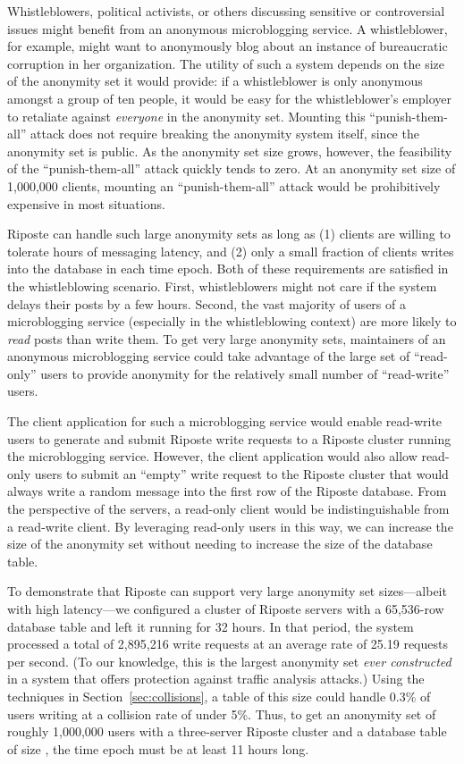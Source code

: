 \documentclass[10pt,twocolumn]{article}
\newcommand{\name}{Riposte\xspace}
\newcommand{\Name}{Riposte\xspace}
\begin{document}
Whistleblowers, political activists,
or others discussing sensitive or controversial
issues might benefit from an anonymous microblogging service.
A whistleblower, for example, might want to anonymously blog
about an instance of bureaucratic corruption in her organization.
The utility of such a system depends on the size of the anonymity set
it would provide:
if a whistleblower is only anonymous amongst a group of ten people,
it would be easy for the whistleblower's employer to retaliate against
{\em everyone} in the anonymity set. 
Mounting this ``punish-them-all'' attack does not require breaking 
the anonymity system itself, since the anonymity set is public.
As the anonymity set size grows, however, the
feasibility of the ``punish-them-all'' attack quickly tends to zero.
At an anonymity set size of 1,000,000 clients, mounting an 
``punish-them-all'' attack would be prohibitively expensive
in most situations.

\Name can handle such large anonymity sets as long as
(1) clients are willing to tolerate hours of messaging latency, and 
(2) only a small fraction of clients writes into the database in each time epoch.
Both of these requirements are satisfied in the whistleblowing
scenario.
First, whistleblowers might not care if the system delays their posts by
a few hours.
Second, the vast majority of users of a microblogging service
(especially in the whistleblowing context) are 
more likely to {\em read} posts than write them.
To get very large anonymity sets, maintainers of an anonymous
microblogging service could take advantage of the large set of
``read-only'' users to provide anonymity for the relatively 
small number of ``read-write'' users.

The client application for such a microblogging service would 
enable read-write users to generate and submit
\name write requests to a \name cluster running the microblogging service.
However, the client application would 
also allow read-only users to submit an ``empty''
write request to the \name cluster that would always write a random
message into the first row of the \name database.
From the perspective of the servers, a read-only client would be 
indistinguishable from a read-write client.
By leveraging read-only users in this way, 
we can increase the size of the anonymity set without
needing to increase the size of the database table.

To demonstrate that \name can support very large anonymity set
sizes---albeit with high latency---we configured a cluster
of \name servers with a 65,536-row database table and left it running for 32 hours.
In that period, the system processed a total of 2,895,216 
write requests at an average rate of 25.19 requests per second.
(To our knowledge, this is the largest
anonymity set {\em ever constructed} in a system that
offers protection against traffic analysis attacks.)
Using the techniques in Section~\ref{sec:collisions},
a table of this size could handle 0.3\% of users writing at
a collision rate of under 5\%.
Thus, to get an anonymity set of roughly 1,000,000 users
with a three-server \name cluster and
a database table of size , the time epoch must 
be at least 11 hours long.
\end{document}
